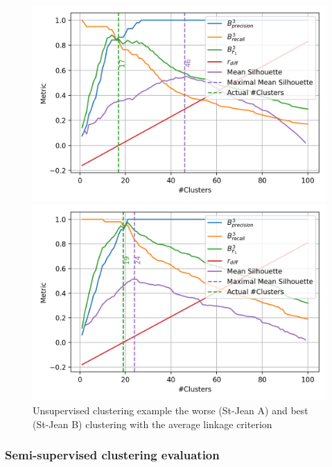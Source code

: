 \begin{figure}
  \caption{Unsupervised clustering example the worse (St-Jean A) and best (St-Jean B) clustering with the average linkage criterion}
  \label{fig:unsupervised_clustering}

  \label{fig:unsupervised_clustering_st_jean_A_average}
  \includegraphics[width=\linewidth]{img/unsupervised_clustering_st_jean_A_average.png}

  \vspace{0.5cm}

  \label{fig:unsupervised_clustering_st_jean_B_average}
  \includegraphics[width=\linewidth]{img/unsupervised_clustering_st_jean_B_average.png}
\end{figure}


\subsubsection{Semi-supervised clustering evaluation}

